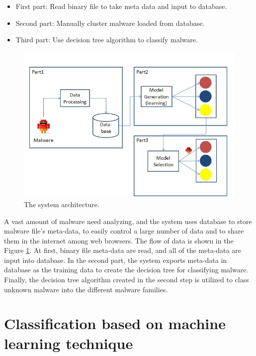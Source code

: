 \begin{itemize}
\item First part: Read binary file to take meta data and input to database.
\item Second part: Manually cluster malware loaded from database.
\item Third part: Use decision tree algorithm to classify malware.
\end{itemize}
\begin{figure}[h!]
\centering
\includegraphics[width=1\textwidth]
{graph/system_architec.jpg}
\caption{The system architecture.}
\label{fig:system_architec}
\end{figure}

A vast amount of malware need analyzing, and the system uses database to store malware file's meta-data, to easily control a large number of data and to share them in the internet among web browsers.
The flow of data is shown in the Figure \ref{fig:system_architec}. At first, binary file meta-data are read, and all of the meta-data are input into database. In the second part, the system exports meta-data in database as the training data to create the decision tree for classifying malware. Finally, the decision tree algorithm created in the second step is utilized to class  unknown malware into the different malware families. 
%
%
\section{Classification based on machine learning technique} 
